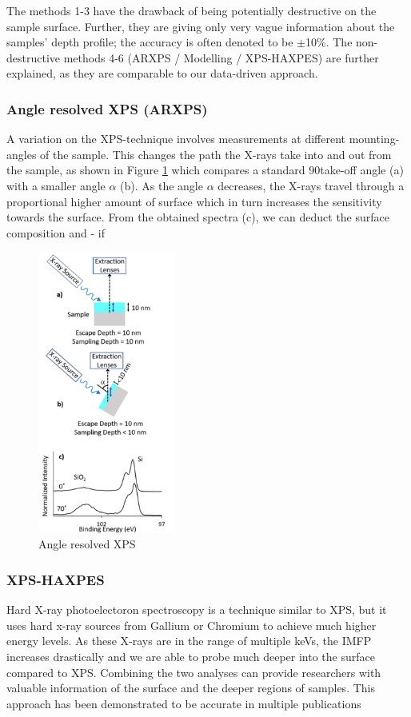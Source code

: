 The methods 1-3 have the drawback of being potentially destructive on the sample surface. Further, they are giving only very vague information about the samples’ depth profile; the accuracy is often denoted to be $\pm$10\%.
The non-destructive methods 4-6 (ARXPS / Modelling / XPS-HAXPES) are further explained, as they are comparable to our data-driven approach.

\subsubsection{Angle resolved XPS (ARXPS)}

A variation on the XPS-technique involves measurements at different mounting-angles of the sample.
This changes the path the X-rays take into and out from the sample, as shown in Figure \ref{fig:arxps} which compares a standard 90\textdegree  take-off angle (a) with a smaller angle $\alpha$ (b). As the angle $\alpha$ decreases, the X-rays travel through a proportional higher amount of surface which in turn increases the sensitivity towards the surface. From the obtained spectra (c), we can deduct the surface composition and - if 

\begin{figure}
    \centering
    \includegraphics[width=0.4\textwidth]{Figures/ARXPS.png}
    \caption{Angle resolved XPS \cite{stevie_introduction_2020}}
    \label{fig:arxps}
\end{figure}


\subsubsection{XPS-HAXPES}

Hard X-ray photoelectoron spectroscopy is a technique similar to XPS, but it uses hard x-ray sources from Gallium or Chromium to achieve much higher energy levels. As these X-rays are in the range of multiple keVs, the IMFP increases drastically and we are able to probe much deeper into the surface compared to XPS. Combining the two analyses can provide researchers with valuable information of the surface and the deeper regions of samples. This approach has been demonstrated to be accurate in multiple publications \cite{bure_assessing_2023, siol_concepts_2020} 